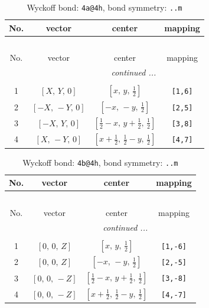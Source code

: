 \documentclass[fleqn,8pt]{jsarticle}
\begin{document}
\begin{longtable}{cccc}
\caption{Wyckoff bond: {\tt 4a@4h}, bond symmetry: {\tt ..m}}
 \\
 \hline \hline
No. & vector & center & mapping \\ \hline \endfirsthead

\multicolumn{3}{l}{\tablename\ \thetable{}} \\
 \hline \hline
No. & vector & center & mapping \\ \hline \endhead

 \hline \hline
\multicolumn{3}{r}{\footnotesize\it continued ...} \\ \endfoot

 \hline \hline
\multicolumn{3}{r}{} \\ \endlastfoot

1 & $\left[ X,\, Y,\, 0 \right]$ & $\left[ x,\, y,\, \frac{1}{2} \right]$ & {\tt [1,6]} \\ \hline
2 & $\left[ - X,\, - Y,\, 0 \right]$ & $\left[ - x,\, - y,\, \frac{1}{2} \right]$ & {\tt [2,5]} \\ \hline
3 & $\left[ - X,\, Y,\, 0 \right]$ & $\left[ \frac{1}{2} - x,\, y + \frac{1}{2},\, \frac{1}{2} \right]$ & {\tt [3,8]} \\ \hline
4 & $\left[ X,\, - Y,\, 0 \right]$ & $\left[ x + \frac{1}{2},\, \frac{1}{2} - y,\, \frac{1}{2} \right]$ & {\tt [4,7]} \\
\end{longtable}
\renewcommand{\arraystretch}{1.2}
\begin{longtable}{cccc}
\caption{Wyckoff bond: {\tt 4b@4h}, bond symmetry: {\tt ..m}}
 \\
 \hline \hline
No. & vector & center & mapping \\ \hline \endfirsthead

\multicolumn{3}{l}{\tablename\ \thetable{}} \\
 \hline \hline
No. & vector & center & mapping \\ \hline \endhead

 \hline \hline
\multicolumn{3}{r}{\footnotesize\it continued ...} \\ \endfoot

 \hline \hline
\multicolumn{3}{r}{} \\ \endlastfoot

1 & $\left[ 0,\, 0,\, Z \right]$ & $\left[ x,\, y,\, \frac{1}{2} \right]$ & {\tt [1,-6]} \\ \hline
2 & $\left[ 0,\, 0,\, Z \right]$ & $\left[ - x,\, - y,\, \frac{1}{2} \right]$ & {\tt [2,-5]} \\ \hline
3 & $\left[ 0,\, 0,\, - Z \right]$ & $\left[ \frac{1}{2} - x,\, y + \frac{1}{2},\, \frac{1}{2} \right]$ & {\tt [3,-8]} \\ \hline
4 & $\left[ 0,\, 0,\, - Z \right]$ & $\left[ x + \frac{1}{2},\, \frac{1}{2} - y,\, \frac{1}{2} \right]$ & {\tt [4,-7]} \\
\end{longtable}
\end{document}
